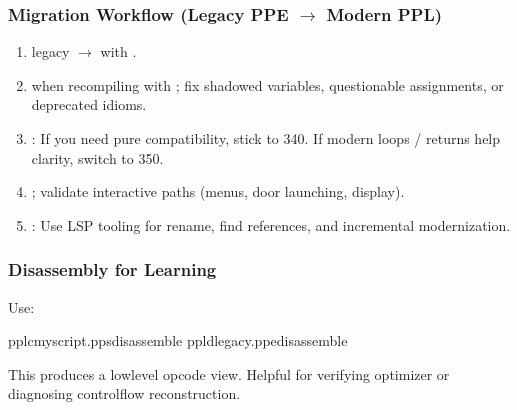 \documentclass[letterpaper,10pt,english]{sphinxmanual}
\begin{document}
\subsubsection{Migration Workflow (Legacy PPE \(\rightarrow\) Modern PPL)}
\label{\detokenize{ppl:migration-workflow-legacy-ppe-modern-ppl}}\begin{enumerate}
%
\item {} 
\sphinxAtStartPar
{} legacy  \(\rightarrow\)  with .

\item {} 
\sphinxAtStartPar
{} when recompiling with ; fix shadowed variables, questionable assignments, or deprecated idioms.

\item {} 
\sphinxAtStartPar
{}: If you need pure compatibility, stick to 340. If modern loops / returns help clarity, switch to 350.

\item {} 
\sphinxAtStartPar
{}; validate interactive paths (menus, door launching, display).

\item {} 
\sphinxAtStartPar
{}: Use LSP tooling for rename, find references, and incremental modernization.

\end{enumerate}


\subsubsection{Disassembly for Learning}
\label{\detokenize{ppl:disassembly-for-learning}}
\sphinxAtStartPar
Use:

\begin{sphinxVerbatim}[commandchars=\\\{\}]
pplcmyscript.pps\PYGZhy{}\PYGZhy{}disassemble
ppldlegacy.ppe\PYGZhy{}\PYGZhy{}disassemble
\end{sphinxVerbatim}

\sphinxAtStartPar
This produces a low\sphinxhyphen{}level opcode view. Helpful for verifying optimizer or diagnosing control\sphinxhyphen{}flow reconstruction.
\end{document}
